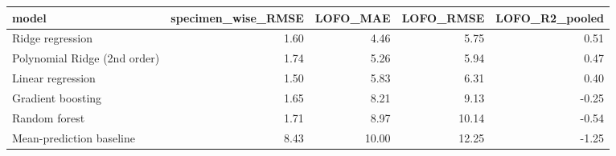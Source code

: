 \begin{tabular}{lrrrr}
\toprule
model & specimen\_wise\_RMSE & LOFO\_MAE & LOFO\_RMSE & LOFO\_R2\_pooled \\
\midrule
Ridge regression & 1.60 & 4.46 & 5.75 & 0.51 \\
Polynomial Ridge (2nd order) & 1.74 & 5.26 & 5.94 & 0.47 \\
Linear regression & 1.50 & 5.83 & 6.31 & 0.40 \\
Gradient boosting & 1.65 & 8.21 & 9.13 & -0.25 \\
Random forest & 1.71 & 8.97 & 10.14 & -0.54 \\
Mean-prediction baseline & 8.43 & 10.00 & 12.25 & -1.25 \\
\bottomrule
\end{tabular}
